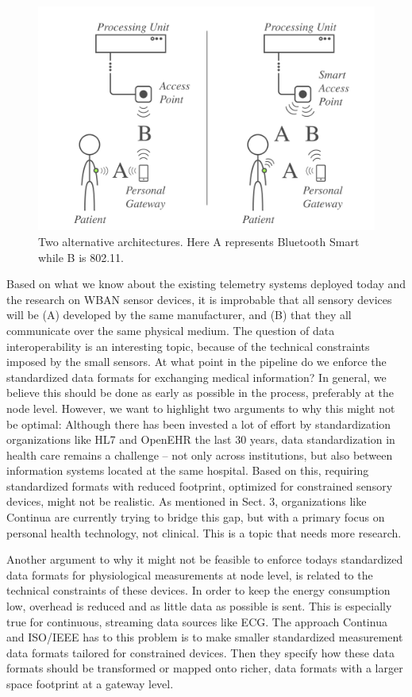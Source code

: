 \begin{figure}[H]
\centering
\includegraphics[scale=0.2]{img/figures/architectureNY.png}
\caption{Two alternative architectures. Here A represents Bluetooth Smart while B is 802.11.}
\label{fig:architecture}
\end{figure}

\noindent
Based on what we know about the existing telemetry systems deployed today and the research on WBAN sensor devices, it is improbable that all sensory devices will be (A) developed by the same manufacturer, and (B) that they all communicate over the same physical medium. The question of data interoperability is an interesting topic, because of the technical constraints imposed by the small sensors. At what point in the pipeline do we enforce the standardized data formats for exchanging medical information? In general, we believe this should be done as early as possible in the process, preferably at the node level. However, we want to highlight two arguments to why this might not be optimal: Although there has been invested a lot of effort by standardization organizations like HL7 and OpenEHR the last 30 years, data standardization in health care remains a challenge -- not only across institutions, but also between information systems located at the same hospital. Based on this, requiring standardized formats with reduced footprint, optimized for constrained sensory devices, might not be realistic. As mentioned in Sect. 3, organizations like Continua are currently trying to bridge this gap, but with a primary focus on personal health technology, not clinical. This is a topic that needs more research.

\noindent
Another argument to why it might not be feasible to enforce todays standardized data formats for physiological measurements at node level, is related to the technical constraints of these devices. In order to keep the energy consumption low, overhead is reduced and as little data as possible is sent. This is especially true for continuous, streaming data sources like ECG. The approach Continua and ISO/IEEE has to this problem is to make smaller standardized measurement data formats tailored for constrained devices. Then they specify how these data formats should be transformed or mapped onto richer, data formats with a larger space footprint at a gateway level.

